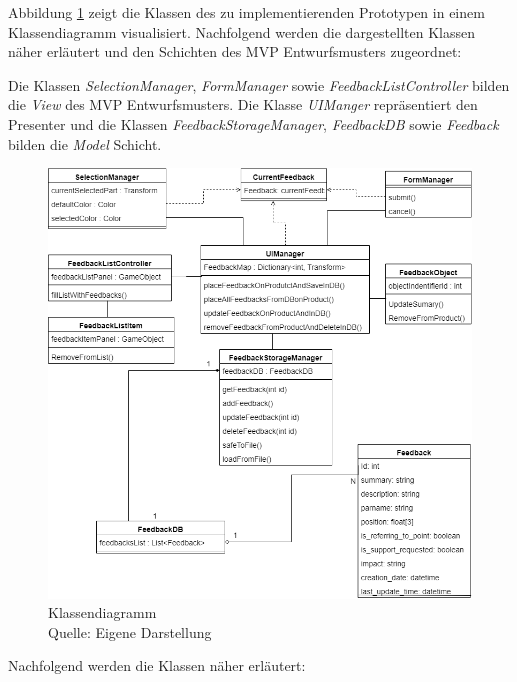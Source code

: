 Abbildung \ref{img:clasdiagramm} zeigt die Klassen des zu implementierenden Prototypen in einem Klassendiagramm visualisiert. Nachfolgend werden die dargestellten Klassen näher erläutert und den Schichten des MVP Entwurfsmusters zugeordnet: 

Die Klassen \textit{SelectionManager}, \textit{FormManager} sowie \textit{FeedbackListController} bilden die \textit{View} des MVP Entwurfsmusters. Die Klasse \textit{UIManger} repräsentiert den Presenter und die Klassen 
\textit{FeedbackStorageManager}, \textit{FeedbackDB} sowie \textit{Feedback} bilden die \textit{Model} Schicht.\\ 

\begin{figure}[H]
	\centering
	\includegraphics[width=.9\textwidth]{resources/conception/klassendiagramm.png}
	\caption{Klassendiagramm \\Quelle: Eigene Darstellung}
	\label{img:clasdiagramm}
\end{figure}

Nachfolgend werden die Klassen näher erläutert: 

